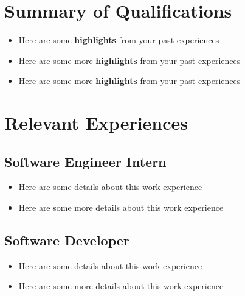 \documentclass{mxresume}
\begin{document}
\begin{minipage}[t]{0.7\textwidth} %
\begin{resumebody}
\section*{Summary of Qualifications}
\begin{itemize}[leftmargin=5mm]
\setlength{\itemsep}{0mm}
\item Here are some \textbf{highlights} from your past experiences
\item Here are some more \textbf{highlights} from your past experiences
\item Here are some more \textbf{highlights} from your past experiences
\end{itemize}
\section*{Relevant Experiences} 
\subsection*{Software Engineer Intern}
\begin{itemize}[leftmargin=5mm]
\setlength{\itemsep}{0mm}
\item Here are some details about this work experience
\item Here are some more details about this work experience
\end{itemize}
\subsection*{Software Developer}
\begin{itemize}[leftmargin=5mm]
\setlength{\itemsep}{0mm}
\item Here are some details about this work experience
\item Here are some more details about this work experience
\end{itemize}

\end{resumebody}
\end{minipage}
\end{document}
